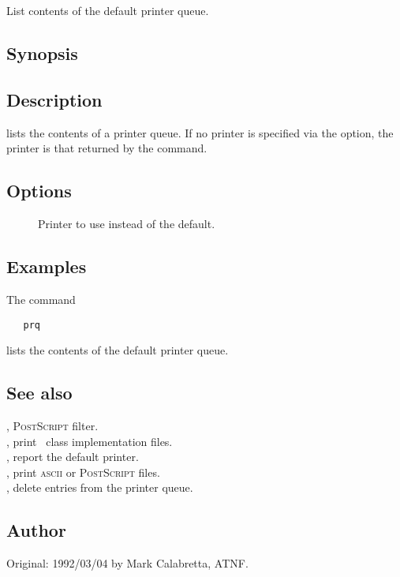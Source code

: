 \newpage
\section{}
\label{prq}

List contents of the default printer queue.

\subsection*{Synopsis}

\begin{synopsis}
\end{synopsis}

\subsection*{Description}

 lists the contents of a printer queue.  If no printer is specified
via the  option, the printer is that returned by the 
command.

\subsection*{Options}

\begin{description}
\item[]
   Printer to use instead of the default.
\end{description}

\subsection*{Examples}

The command

\begin{verbatim}
   prq
\end{verbatim}

\noindent
lists the contents of the default printer queue.

\subsection*{See also}

, \textsc{PostScript} filter.\\
, print \aipspp\ class implementation files.\\
, report the default printer.\\
, print \textsc{ascii} or \textsc{PostScript} files.\\
, delete entries from the printer queue.

\subsection*{Author}

Original: 1992/03/04 by Mark Calabretta, ATNF.
